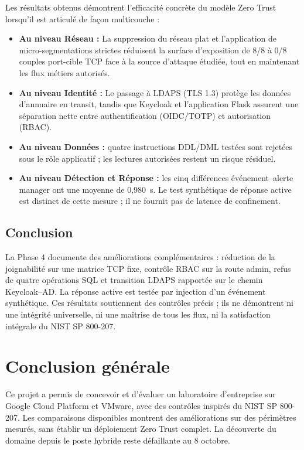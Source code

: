 \documentclass[a4paper,12pt]{report}
\begin{document}
Les résultats obtenus démontrent l'efficacité concrète du modèle Zero Trust lorsqu'il est articulé de façon multicouche :
\begin{itemize}
\item \textbf{Au niveau Réseau :} La suppression du réseau plat et l'application de micro-segmentations strictes réduisent la surface d'exposition de 8/8 à 0/8 couples port-cible TCP face à la source d'attaque étudiée, tout en maintenant les flux métiers autorisés.
\item \textbf{Au niveau Identité :} Le passage à LDAPS (TLS 1.3) protège les données d'annuaire en transit, tandis que Keycloak et l'application Flask assurent une séparation nette entre authentification (OIDC/TOTP) et autorisation (RBAC).
\item \textbf{Au niveau Données :} quatre instructions DDL/DML testées sont rejetées sous le rôle applicatif ; les lectures autorisées restent un risque résiduel.
\item \textbf{Au niveau Détection et Réponse :} les cinq différences événement--alerte manager ont une moyenne de 0,980~s. Le test synthétique de réponse active est distinct de cette mesure ; il ne fournit pas de latence de confinement.
\end{itemize}

\section*{Conclusion}
La Phase 4 documente des améliorations complémentaires : réduction de la joignabilité sur une matrice TCP fixe, contrôle RBAC sur la route admin, refus de quatre opérations SQL et transition LDAPS rapportée sur le chemin Keycloak--AD. La réponse active est testée par injection d'un événement synthétique. Ces résultats soutiennent des contrôles précis ; ils ne démontrent ni une intégrité universelle, ni une maîtrise de tous les flux, ni la satisfaction intégrale du NIST SP 800-207.

\chapter*{Conclusion générale}
Ce projet a permis de concevoir et d'évaluer un laboratoire d'entreprise sur Google Cloud Platform et VMware, avec des contrôles inspirés du NIST SP 800-207. Les comparaisons disponibles montrent des améliorations sur des périmètres mesurés, sans établir un déploiement Zero Trust complet. La découverte du domaine depuis le poste hybride reste défaillante au 8 octobre.
\end{document}
